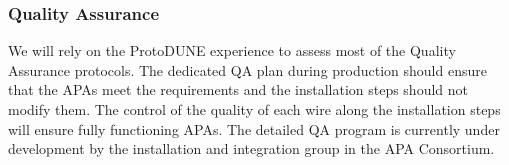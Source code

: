 \subsubsection{Quality Assurance}

We will rely on the ProtoDUNE experience to assess most of the Quality Assurance protocols. The dedicated QA plan during production should ensure that the APAs meet the requirements and the installation steps should not modify them. The control of the quality of each wire along the installation steps will ensure fully functioning APAs. The detailed QA program is currently under development by the installation and integration group in the APA Consortium.


